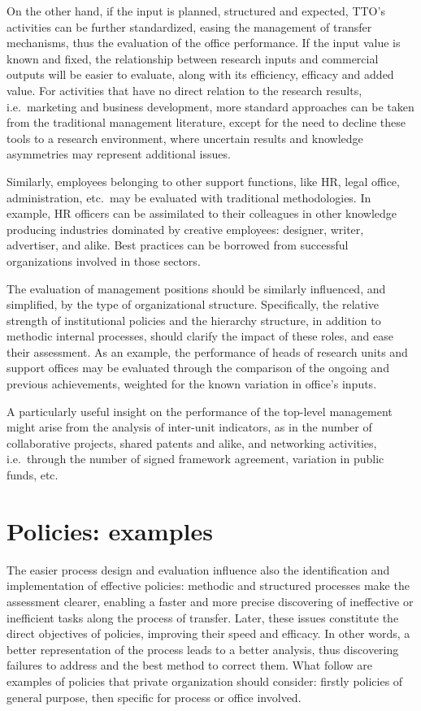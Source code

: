 On the other hand, if the input is planned, structured and expected, TTO's activities can be further standardized, easing the management of transfer mechanisms, thus the evaluation of the office performance. If the input value is known and fixed, the relationship between research inputs and commercial outputs will be easier to evaluate, along with its efficiency, efficacy and added value. For activities that have no direct relation to the research results, i.e.\ marketing and business development, more standard approaches can be taken from the traditional management literature, except for the need to decline these tools to a research environment, where uncertain results and knowledge asymmetries may represent additional issues. 

Similarly, employees belonging to other support functions, like HR, legal office, administration, etc.\ may be evaluated with traditional methodologies. In example, HR officers can be assimilated to their colleagues in other knowledge producing industries dominated by creative employees: designer, writer, advertiser, and alike. Best practices can be borrowed from successful organizations involved in those sectors.

The evaluation of management positions should be similarly influenced, and simplified, by the type of organizational structure. Specifically, the relative strength of institutional policies and the hierarchy structure, in addition to methodic internal processes, should clarify the impact of these roles, and ease their assessment. As an example, the performance of heads of research units and support offices may be evaluated through the comparison of the ongoing and previous achievements, weighted for the known variation in office's inputs. 

A particularly useful insight on the performance of the top-level management might arise from the analysis of inter-unit indicators, as in the number of collaborative projects, shared patents and alike, and networking activities, i.e.\ through the number of signed framework agreement, variation in public funds, etc.

\section{Policies: examples} 

The easier process design and evaluation influence also the identification and implementation of effective policies:  methodic and structured processes make the assessment clearer, enabling a faster and more precise discovering of ineffective or inefficient tasks along the process of transfer. Later, these issues constitute the direct objectives of policies, improving their speed and efficacy. In other words, a better representation of the process leads to a better analysis, thus discovering failures to address and the best method to correct them. What follow are examples of policies that private organization should consider: firstly policies of general purpose, then specific for process or office involved.

